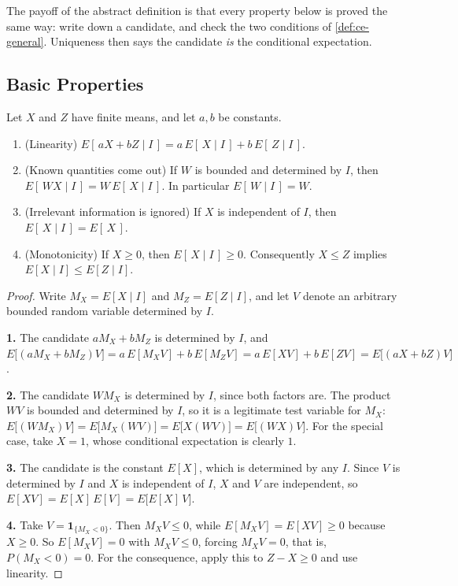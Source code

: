 The payoff of the abstract definition is that every property below is proved the same way:
write down a candidate, and check the two conditions of \autoref{def:ce-general}.
Uniqueness then says the candidate \emph{is} the conditional expectation.

\subsection{Basic Properties}

\begin{proposition}\label{prop:ce-properties}
	Let $X$ and $Z$ have finite means, and let $a,b$ be constants.
	\begin{enumerate}[nosep]
		\item (Linearity) $E[\,aX+bZ\mid I\,]=a\,E[\,X\mid I\,]+b\,E[\,Z\mid I\,]$.
		\item (Known quantities come out) If $W$ is bounded and determined by $I$, then $E[\,WX\mid I\,]=W\,E[\,X\mid I\,]$.
		      In particular $E[\,W\mid I\,]=W$.
		\item (Irrelevant information is ignored) If $X$ is independent of $I$, then $E[\,X\mid I\,]=E[\,X\,]$.
		\item (Monotonicity) If $X\ge0$, then $E[\,X\mid I\,]\ge0$.
		      Consequently $X\le Z$ implies $E[X\mid I]\le E[Z\mid I]$.
	\end{enumerate}
\end{proposition}

\begin{proof}
	Write $M_{X}=E[X\mid I]$ and $M_{Z}=E[Z\mid I]$, and let $V$ denote an arbitrary bounded random variable determined by $I$.

	\textbf{1.} The candidate $aM_{X}+bM_{Z}$ is determined by $I$, and
	$E\bigl[(aM_{X}+bM_{Z})V\bigr]=a\,E[M_{X}V]+b\,E[M_{Z}V]=a\,E[XV]+b\,E[ZV]=E\bigl[(aX+bZ)V\bigr]$.

	\textbf{2.} The candidate $WM_{X}$ is determined by $I$, since both factors are.
	The product $WV$ is bounded and determined by $I$, so it is a legitimate test variable for $M_{X}$:
	$E\bigl[(WM_{X})V\bigr]=E\bigl[M_{X}(WV)\bigr]=E\bigl[X(WV)\bigr]=E\bigl[(WX)V\bigr]$.
	For the special case, take $X=1$, whose conditional expectation is clearly $1$.

	\textbf{3.} The candidate is the constant $E[X]$, which is determined by any $I$.
	Since $V$ is determined by $I$ and $X$ is independent of $I$, $X$ and $V$ are independent, so
	$E[XV]=E[X]\,E[V]=E\bigl[E[X]\,V\bigr]$.

	\textbf{4.} Take $V=\mathbf{1}_{\{M_{X}<0\}}$.
	Then $M_{X}V\le0$, while $E[M_{X}V]=E[XV]\ge0$ because $X\ge0$.
	So $E[M_{X}V]=0$ with $M_{X}V\le0$, forcing $M_{X}V=0$, that is, $P(M_{X}<0)=0$.
	For the consequence, apply this to $Z-X\ge0$ and use linearity.
\end{proof}

